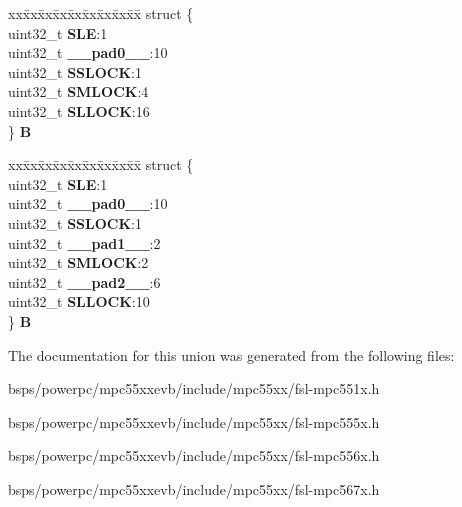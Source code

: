 \begin{DoxyCompactItemize}
\begin{tabbing}
\end{tabbing}\item 
\mbox{\label{unionFLASH__tag_1_1SLMLR__tag_a41ae82264e14fd01f25ccfee81d8c0de}} 
\begin{tabbing}
xx\=xx\=xx\=xx\=xx\=xx\=xx\=xx\=xx\=\kill
struct \{\\
\>uint32\_t {\bfseries SLE}:1\\
\>uint32\_t {\bfseries \_\_pad0\_\_}:10\\
\>uint32\_t {\bfseries SSLOCK}:1\\
\>uint32\_t {\bfseries SMLOCK}:4\\
\>uint32\_t {\bfseries SLLOCK}:16\\
\} {\bfseries B}\\

\end{tabbing}\item 
\mbox{\label{unionFLASH__tag_1_1SLMLR__tag_aa528c9beeec7fbf395febdf07e2515f2}} 
\begin{tabbing}
xx\=xx\=xx\=xx\=xx\=xx\=xx\=xx\=xx\=\kill
struct \{\\
\>uint32\_t {\bfseries SLE}:1\\
\>uint32\_t {\bfseries \_\_pad0\_\_}:10\\
\>uint32\_t {\bfseries SSLOCK}:1\\
\>uint32\_t {\bfseries \_\_pad1\_\_}:2\\
\>uint32\_t {\bfseries SMLOCK}:2\\
\>uint32\_t {\bfseries \_\_pad2\_\_}:6\\
\>uint32\_t {\bfseries SLLOCK}:10\\
\} {\bfseries B}\\

\end{tabbing}\end{DoxyCompactItemize}


The documentation for this union was generated from the following files\+:\begin{DoxyCompactItemize}
\item 
bsps/powerpc/mpc55xxevb/include/mpc55xx/fsl-\/mpc551x.\+h\item 
bsps/powerpc/mpc55xxevb/include/mpc55xx/fsl-\/mpc555x.\+h\item 
bsps/powerpc/mpc55xxevb/include/mpc55xx/fsl-\/mpc556x.\+h\item 
bsps/powerpc/mpc55xxevb/include/mpc55xx/fsl-\/mpc567x.\+h\end{DoxyCompactItemize}
